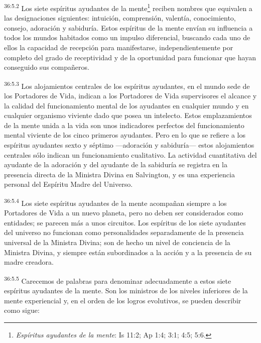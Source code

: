 \par
\textsuperscript{36:5.2} Los siete espíritus ayudantes de la mente\footnote{\textit{Espíritus ayudantes de la mente}: Is 11:2; Ap 1:4; 3:1; 4:5; 5:6.} reciben nombres que equivalen a las designaciones siguientes: intuición, comprensión, valentía, conocimiento, consejo, adoración y sabiduría. Estos espíritus de la mente envían su influencia a todos los mundos habitados como un impulso diferencial, buscando cada uno de ellos la capacidad de recepción para manifestarse, independientemente por completo del grado de receptividad y de la oportunidad para funcionar que hayan conseguido sus compañeros.

\par
\textsuperscript{36:5.3} Los alojamientos centrales de los espíritus ayudantes, en el mundo sede de los Portadores de Vida, indican a los Portadores de Vida supervisores el alcance y la calidad del funcionamiento mental de los ayudantes en cualquier mundo y en cualquier organismo viviente dado que posea un intelecto. Estos emplazamientos de la mente unida a la vida son unos indicadores perfectos del funcionamiento mental viviente de los cinco primeros ayudantes. Pero en lo que se refiere a los espíritus ayudantes sexto y séptimo ---adoración y sabiduría--- estos alojamientos centrales sólo indican un funcionamiento cualitativo. La actividad cuantitativa del ayudante de la adoración y del ayudante de la sabiduría se registra en la presencia directa de la Ministra Divina en Salvington, y es una experiencia personal del Espíritu Madre del Universo.

\par
\textsuperscript{36:5.4} Los siete espíritus ayudantes de la mente acompañan siempre a los Portadores de Vida a un nuevo planeta, pero no deben ser considerados como entidades; se parecen más a unos circuitos. Los espíritus de los siete ayudantes del universo no funcionan como personalidades separadamente de la presencia universal de la Ministra Divina; son de hecho un nivel de conciencia de la Ministra Divina, y siempre están subordinados a la acción y a la presencia de su madre creadora.

\par
\textsuperscript{36:5.5} Carecemos de palabras para denominar adecuadamente a estos siete espíritus ayudantes de la mente. Son los ministros de los niveles inferiores de la mente experiencial y, en el orden de los logros evolutivos, se pueden describir como sigue:


